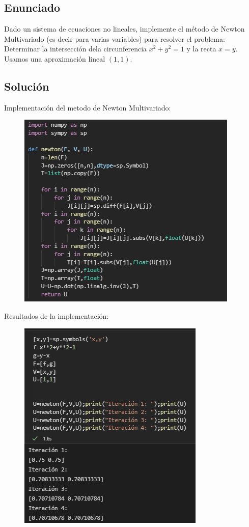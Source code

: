 \documentclass[10pt,letterpaper]{article}
\begin{document}
	\subsection{Enunciado}
	Dado un sistema de ecuaciones no lineales, implemente el método de Newton Multivariado (es decir para varias variables) para resolver el problema:\\
	Determinar la intersección dela circunferencia $x^2+y^2=1$ y la recta $x=y$. Usamos una aproximación lineal $(1,1)$.
	\subsection{Solución}
	Implementación del metodo de Newton Multivariado:\\
	\begin{figure}[H]
		\includegraphics{imagen6}
		\centering
	\end{figure}
	Resultados de la implementación:\\
	\begin{figure}[H]
		\includegraphics{imagen7}
		\centering
	\end{figure}
\end{document}
